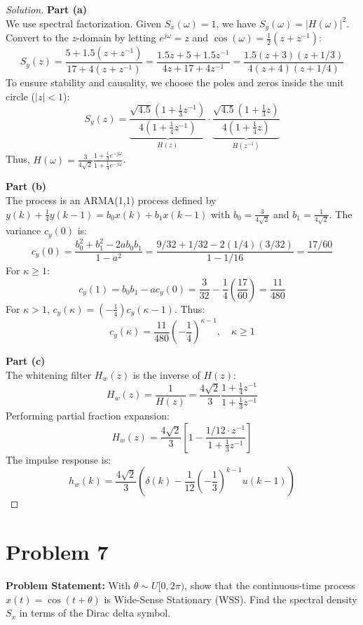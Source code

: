 \documentclass{article}
\begin{document}
\begin{proof}[Solution]
	\textbf{Part (a)}\\
	We use spectral factorization. Given $S_x(\omega) = 1$, we have $S_y(\omega) = |H(\omega)|^2$. Convert to the $z$-domain by letting $e^{j\omega} = z$ and $\cos(\omega) = \frac{1}{2}(z + z^{-1})$:
	\[ S_y(z) = \frac{5 + 1.5(z + z^{-1})}{17 + 4(z + z^{-1})} = \frac{1.5z + 5 + 1.5z^{-1}}{4z + 17 + 4z^{-1}} = \frac{1.5(z+3)(z+1/3)}{4(z+4)(z+1/4)} \]
	To ensure stability and causality, we choose the poles and zeros inside the unit circle ($|z| < 1$):
	\[ S_y(z) = \underbrace{\frac{\sqrt{4.5}(1 + \frac{1}{3}z^{-1})}{4(1 + \frac{1}{4}z^{-1})}}_{H(z)} \cdot \underbrace{\frac{\sqrt{4.5}(1 + \frac{1}{3}z)}{4(1 + \frac{1}{4}z)}}_{H(z^{-1})} \]
	Thus, $H(\omega) = \frac{3}{4\sqrt{2}} \frac{1 + \frac{1}{3}e^{-j\omega}}{1 + \frac{1}{4}e^{-j\omega}}$.
	
	\textbf{Part (b)}\\
	The process is an ARMA(1,1) process defined by $y(k) + \frac{1}{4}y(k-1) = b_0 x(k) + b_1 x(k-1)$ with $b_0 = \frac{3}{4\sqrt{2}}$ and $b_1 = \frac{1}{4\sqrt{2}}$.
	The variance $c_y(0)$ is:
	\[ c_y(0) = \frac{b_0^2 + b_1^2 - 2ab_0b_1}{1-a^2} = \frac{9/32 + 1/32 - 2(1/4)(3/32)}{1 - 1/16} = \frac{17/60}{\text{}} \]
	For $\kappa \ge 1$:
	\[ c_y(1) = b_0 b_1 - a c_y(0) = \frac{3}{32} - \frac{1}{4}\left(\frac{17}{60}\right) = \frac{11}{480} \]
	For $\kappa > 1$, $c_y(\kappa) = (-\frac{1}{4})c_y(\kappa-1)$. Thus:
	\[ c_y(\kappa) = \frac{11}{480} \left( -\frac{1}{4} \right)^{\kappa-1}, \quad \kappa \ge 1 \]

	\textbf{Part (c)}\\
	The whitening filter $H_w(z)$ is the inverse of $H(z)$:
	\[ H_w(z) = \frac{1}{H(z)} = \frac{4\sqrt{2}}{3} \frac{1 + \frac{1}{4}z^{-1}}{1 + \frac{1}{3}z^{-1}} \]
	Performing partial fraction expansion:
	\[ H_w(z) = \frac{4\sqrt{2}}{3} \left[ 1 - \frac{1/12 \cdot z^{-1}}{1 + \frac{1}{3}z^{-1}} \right] \]
	The impulse response is:
	\[ h_w(k) = \frac{4\sqrt{2}}{3} \left( \delta(k) - \frac{1}{12} \left( -\frac{1}{3} \right)^{k-1} u(k-1) \right) \]
\end{proof}

\section*{Problem 7}
\textbf{Problem Statement:}
With $\theta \sim U[0, 2\pi)$, show that the continuous-time process $x(t) = \cos(t + \theta)$ is Wide-Sense Stationary (WSS). Find the spectral density $S_x$ in terms of the Dirac delta symbol.
\end{document}
